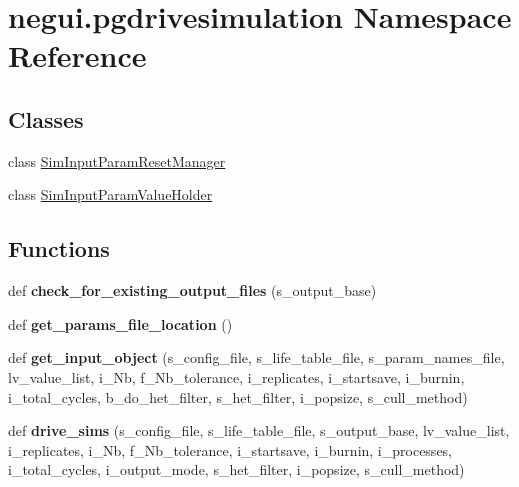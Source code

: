 \hypertarget{namespacenegui_1_1pgdrivesimulation}{}\section{negui.\+pgdrivesimulation Namespace Reference}
\label{namespacenegui_1_1pgdrivesimulation}
\subsection*{Classes}
\begin{DoxyCompactItemize}
\item 
class \hyperlink{classnegui_1_1pgdrivesimulation_1_1SimInputParamResetManager}{Sim\+Input\+Param\+Reset\+Manager}
\item 
class \hyperlink{classnegui_1_1pgdrivesimulation_1_1SimInputParamValueHolder}{Sim\+Input\+Param\+Value\+Holder}
\end{DoxyCompactItemize}
\subsection*{Functions}
\begin{DoxyCompactItemize}
\item 
def {\bfseries check\+\_\+for\+\_\+existing\+\_\+output\+\_\+files} (s\+\_\+output\+\_\+base)\hypertarget{namespacenegui_1_1pgdrivesimulation_af32fb4704d45d6023fb8ed8c3bcbac11}{}\label{namespacenegui_1_1pgdrivesimulation_af32fb4704d45d6023fb8ed8c3bcbac11}

\item 
def {\bfseries get\+\_\+params\+\_\+file\+\_\+location} ()\hypertarget{namespacenegui_1_1pgdrivesimulation_a7c54a3ee4bb23e9839f5aa4f56e18b9d}{}\label{namespacenegui_1_1pgdrivesimulation_a7c54a3ee4bb23e9839f5aa4f56e18b9d}

\item 
def {\bfseries get\+\_\+input\+\_\+object} (s\+\_\+config\+\_\+file, s\+\_\+life\+\_\+table\+\_\+file, s\+\_\+param\+\_\+names\+\_\+file, lv\+\_\+value\+\_\+list, i\+\_\+\+Nb, f\+\_\+\+Nb\+\_\+tolerance, i\+\_\+replicates, i\+\_\+startsave, i\+\_\+burnin, i\+\_\+total\+\_\+cycles, b\+\_\+do\+\_\+het\+\_\+filter, s\+\_\+het\+\_\+filter, i\+\_\+popsize, s\+\_\+cull\+\_\+method)\hypertarget{namespacenegui_1_1pgdrivesimulation_a54d30848a601e276699e16354e15168e}{}\label{namespacenegui_1_1pgdrivesimulation_a54d30848a601e276699e16354e15168e}

\item 
def {\bfseries drive\+\_\+sims} (s\+\_\+config\+\_\+file, s\+\_\+life\+\_\+table\+\_\+file, s\+\_\+output\+\_\+base, lv\+\_\+value\+\_\+list, i\+\_\+replicates, i\+\_\+\+Nb, f\+\_\+\+Nb\+\_\+tolerance, i\+\_\+startsave, i\+\_\+burnin, i\+\_\+processes, i\+\_\+total\+\_\+cycles, i\+\_\+output\+\_\+mode, s\+\_\+het\+\_\+filter, i\+\_\+popsize, s\+\_\+cull\+\_\+method)\hypertarget{namespacenegui_1_1pgdrivesimulation_aaad53a7a509a1df6ccbe010830bdcacc}{}\label{namespacenegui_1_1pgdrivesimulation_aaad53a7a509a1df6ccbe010830bdcacc}

\end{DoxyCompactItemize}
